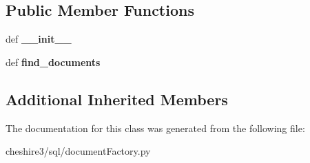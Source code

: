 \subsection*{Public Member Functions}
\begin{DoxyCompactItemize}
\item 
\hypertarget{classcheshire3_1_1sql_1_1document_factory_1_1_postgres_document_stream_aae9250899bacf9240a09a35f08d9cecd}{def {\bfseries \-\_\-\-\_\-init\-\_\-\-\_\-}}\label{classcheshire3_1_1sql_1_1document_factory_1_1_postgres_document_stream_aae9250899bacf9240a09a35f08d9cecd}

\item 
\hypertarget{classcheshire3_1_1sql_1_1document_factory_1_1_postgres_document_stream_a97be70df68a8acd5ffaf22df9390f20f}{def {\bfseries find\-\_\-documents}}\label{classcheshire3_1_1sql_1_1document_factory_1_1_postgres_document_stream_a97be70df68a8acd5ffaf22df9390f20f}

\end{DoxyCompactItemize}
\subsection*{Additional Inherited Members}


The documentation for this class was generated from the following file\-:\begin{DoxyCompactItemize}
\item 
cheshire3/sql/document\-Factory.\-py\end{DoxyCompactItemize}
